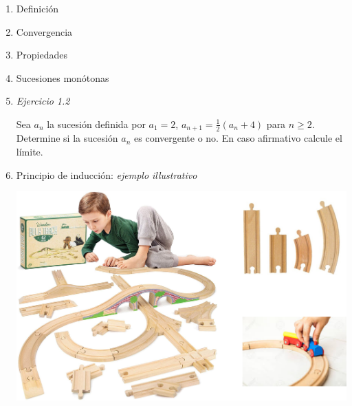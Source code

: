 \documentclass[12pt,oneside]{book}
\begin{document}
\begin{enumerate}


\item Definición

\vspace{100pt}

\item Convergencia

\vspace{100pt}

\item Propiedades

\vspace{100pt}

% 
%  
%   


\newpage

\item Sucesiones monótonas

\vspace{200pt}


\item \textit{Ejercicio 1.2}

Sea $a_{ n }$ la sucesión definida por $a _{1} =2$,  $a_{n+1} = \tfrac{1}{2} (a _{n} + 4)$ para $n \geq 2$. Determine si la sucesión $a _{n} $ es convergente o no. En caso afirmativo calcule el límite.


\newpage

\item Principio de inducción: \textit{ejemplo illustrativo}

\includegraphics[width=400pt]{figures/induccion.png}



\end{enumerate}
\end{document}
